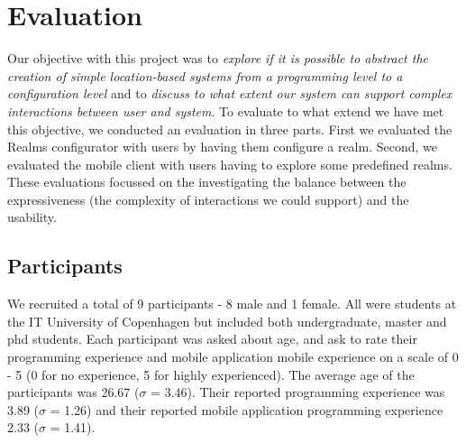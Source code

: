 \section{Evaluation}
\label{sec.eval}
Our objective with this project was to \emph{explore if it is possible to abstract the creation of simple location-based systems from a programming level to a configuration level} and to \emph{discuss to what extent our system can support complex interactions between user and system}. To evaluate to what extend we have met this objective, we conducted an evaluation in three parts. First we evaluated the Realms configurator with users by having them configure a realm. Second, we evaluated the mobile client with users having to explore some predefined realms. These evaluations focussed on the investigating the balance between the expressiveness (the complexity of interactions we could support) and the usability.

\subsection{Participants} %
\label{sub:participants}
We recruited a total of 9 participants - 8 male and 1 female. All were students at the IT University of Copenhagen but included both undergraduate, master and phd students. Each participant was asked about age, and ask to rate their programming experience and mobile application mobile experience on a scale of 0 - 5 (0 for no experience, 5 for highly experienced). The average age of the participants was 26.67 ($\sigma$ = 3.46). Their reported programming experience was 3.89 ($\sigma$ = 1.26) and their reported mobile application programming experience 2.33 ($\sigma$ =  1.41). 

